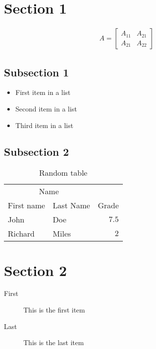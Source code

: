 \section*{Section 1}

\begin{align}
A = 
\begin{bmatrix}
A_{11} & A_{21} \\
A_{21} & A_{22}
\end{bmatrix}
\end{align}

\subsection*{Subsection 1}

\begin{itemize}
\item First item in a list 
\item Second item in a list 
\item Third item in a list
\end{itemize}

\subsection*{Subsection 2}

\begin{table}
\caption{Random table}
\centering
\begin{tabular}{llr}
\toprule
\multicolumn{2}{c}{Name} \\
\cmidrule(r){1-2}
First name & Last Name & Grade \\
\midrule
John & Doe & $7.5$ \\
Richard & Miles & $2$ \\
\bottomrule
\end{tabular}
\end{table}

\section*{Section 2}

\begin{description}
\item[First] This is the first item
\item[Last] This is the last item
\end{description}
